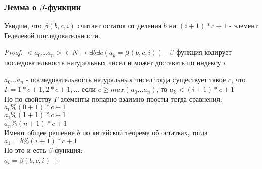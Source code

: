 \subsubsection{Лемма о \texorpdfstring{$\beta$}{бета}-функции}
\label{sec-11-3-3}
\begin{lemma}
Увидим, что $\beta(b,c,i)$ считает остаток от деления $b$ на
$(i + 1) * c + 1$ - элемент Геделевой последовательности.
\end{lemma}
\begin{proof}
$<a_0 \ldots a_n> \in N \to \exists b \exists c (a_k=\beta(b,c,i))$ - $\beta$-функция кодирует
последовательность натуральных чисел и может
доставать по индексу $i$

$a_0 \ldots a_n$  - последовательность натуральных чисел
тогда существует такое $c$, что $\Gamma = 1 * c + 1, 2 * c + 1,\ldots$
если $c \geq max(a_0 \ldots a_n)$, то $a_k < (i + 1) * c + 1$\\
Но по свойству $\Gamma$ элементы попарно взаимно просты
тогда сравнения:\\
$a_0 \% (0+1)*c+1$\\
$a_1 \% (1+1)*c+1$\\
$\ldots$\\
$a_n \% (n + 1) * c + 1$\\
Имеют общее решение $b$ по китайской теореме об остатках, тогда $a_1 = b \% (i+1)*c + 1$\\
Но это и есть $\beta$-функция:\\
$a_i = \beta(b,c,i)$
\end{proof}
